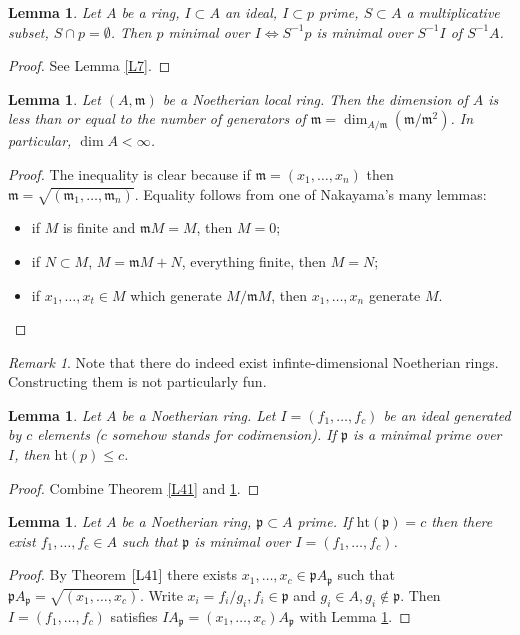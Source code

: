 \documentclass{article}
\newcommand{\fr}{\mathfrak}
\theoremstyle{plain}
\newtheorem{lem}[thm]{Lemma}
\theoremstyle{definition}
\theoremstyle{remark}
\newtheorem*{rem}{Remark}
\begin{document}
\begin{lem}
\label{L42}
Let $A$ be a ring, $I\subset A$ an ideal, $I\subset p$ prime, $S\subset A$ a multiplicative subset, $S\cap p = \emptyset$. Then $p$ minimal over $I \Leftrightarrow S^{-1}p$ is minimal over $S^{-1}I$ of $S^{-1}A$.
\end{lem}

\begin{proof}
See Lemma \ref{L7}.
\end{proof}




\begin{lem}
\label{L43}
Let $(A,\fr m)$ be a Noetherian local ring. Then the dimension of $A$ is less than or equal to the number of generators of $\fr m=\dim_{A/\fr m}\left(\fr m/\fr m^2\right)$. In particular, $\dim A<\infty$.
\end{lem}
\begin{proof}
The inequality is clear because if $\fr m=(x_1,\ldots,x_n)$ then $\fr m=\sqrt{(\fr m_1,\ldots,\fr m_n)}.$ Equality follows from one of Nakayama's many lemmas:
\begin{itemize}
\item if $M$ is finite and $\fr m M=M$, then $M=0$;
\item if $N\subset M$, $M=\fr mM+N$, everything finite, then $M=N$;
\item if $x_1,\ldots,x_t\in M$ which generate $M/\fr mM$, then $x_1,\ldots, x_n$ generate $M$.
\end{itemize}
\end{proof}

\begin{rem}
Note that there do indeed exist infinte-dimensional Noetherian rings. Constructing them is not particularly fun.
\end{rem}

\begin{lem}
\label{L44}
Let $A$ be a Noetherian ring. Let $I=(f_1,\ldots,f_c)$ be an ideal generated by $c$ elements ($c$ somehow stands for codimension). If $\fr p$ is a minimal prime over $I$, then $\text{ht}(p)\leq c$.
\end{lem}
\begin{proof}
Combine Theorem \ref{L41} and \ref{L42}.
\end{proof}

\begin{lem}
\label{L45}
Let $A$ be a Noetherian ring, $\fr p\subset A$ prime. If $\text{ht}(\fr p)=c$ then there exist $f_1,\ldots, f_c\in A$ such that $\fr p$ is minimal over $I=(f_1,\ldots,f_c)$.
\end{lem}
\begin{proof}
By Theorem $\ref{L41}$ there exists $x_1,\ldots, x_c\in\fr pA_\fr p$ such that $\fr pA_\fr p=\sqrt{(x_1,\ldots,x_c)}$. Write $x_i=f_i/g_i,f_i\in\fr p$ and $g_i\in A,g_i\notin\fr p$. Then $I=(f_1,\ldots, f_c)$ satisfies $IA_\fr p=(x_1,\ldots,x_c)A_\fr p$ with Lemma \ref{L42}.
\end{proof}
\end{document}
